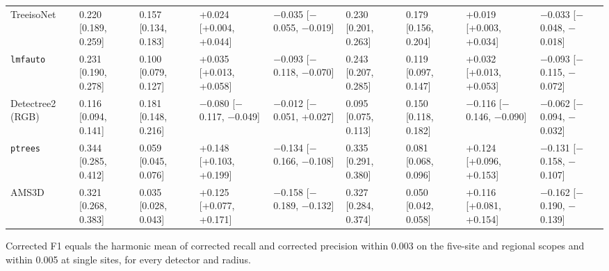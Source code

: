 \documentclass[10pt]{article}
\begin{document}
{\begin{xltabular}{\textwidth}{lLLLLLLLL}
TreeisoNet & 0.220 [0.189, 0.259] & 0.157 [0.134, 0.183] & +0.024 [+0.004, +0.044] & $-$0.035 [$-$0.055, $-$0.019] & 0.230 [0.201, 0.263] & 0.179 [0.156, 0.204] & +0.019 [+0.003, +0.034] & $-$0.033 [$-$0.048, $-$0.018] \\
\texttt{lmfauto} & 0.231 [0.190, 0.278] & 0.100 [0.079, 0.127] & +0.035 [+0.013, +0.058] & $-$0.093 [$-$0.118, $-$0.070] & 0.243 [0.207, 0.285] & 0.119 [0.097, 0.147] & +0.032 [+0.013, +0.053] & $-$0.093 [$-$0.115, $-$0.072] \\
Detectree2 (RGB) & 0.116 [0.094, 0.141] & 0.181 [0.148, 0.216] & $-$0.080 [$-$0.117, $-$0.049] & $-$0.012 [$-$0.051, +0.027] & 0.095 [0.075, 0.113] & 0.150 [0.118, 0.182] & $-$0.116 [$-$0.146, $-$0.090] & $-$0.062 [$-$0.094, $-$0.032] \\
\texttt{ptrees} & 0.344 [0.285, 0.412] & 0.059 [0.045, 0.076] & +0.148 [+0.103, +0.199] & $-$0.134 [$-$0.166, $-$0.108] & 0.335 [0.291, 0.380] & 0.081 [0.068, 0.096] & +0.124 [+0.096, +0.153] & $-$0.131 [$-$0.158, $-$0.107] \\
AMS3D & 0.321 [0.268, 0.383] & 0.035 [0.028, 0.043] & +0.125 [+0.077, +0.171] & $-$0.158 [$-$0.189, $-$0.132] & 0.327 [0.284, 0.374] & 0.050 [0.042, 0.058] & +0.116 [+0.081, +0.154] & $-$0.162 [$-$0.190, $-$0.139] \\
\end{xltabular}
}

Corrected F1 equals the harmonic mean of corrected recall and corrected
precision within 0.003 on the five-site and regional scopes and within 0.005 at
single sites, for every detector and radius.
\end{document}
